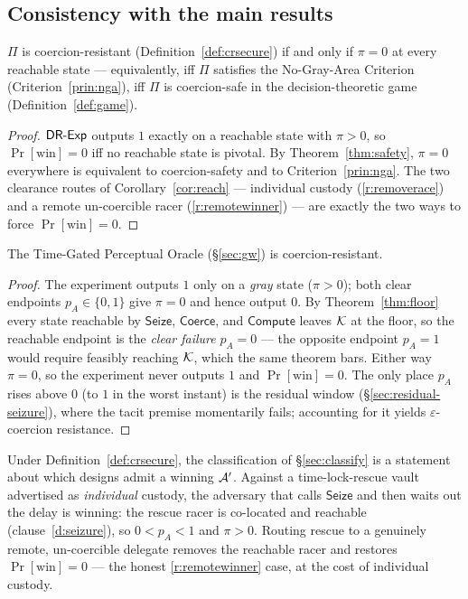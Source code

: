\subsection{Consistency with the main results}

\begin{theorem}\label{thm:game-nga}
$\Pi$ is coercion-resistant (Definition~\ref{def:crsecure}) if and only if
$\pi = 0$ at every reachable state --- equivalently, iff $\Pi$ satisfies the
No-Gray-Area Criterion (Criterion~\ref{prin:nga}), iff $\Pi$ is coercion-safe in
the decision-theoretic game (Definition~\ref{def:game}).
\end{theorem}
\begin{proof}
$\mathsf{DR}\text{-}\mathsf{Exp}$ outputs $1$ exactly on a reachable state with $\pi > 0$, so
$\Pr[\text{win}] = 0$ iff no reachable state is pivotal. By
Theorem~\ref{thm:safety}, $\pi = 0$ everywhere is equivalent to coercion-safety
and to Criterion~\ref{prin:nga}. The two clearance routes of
Corollary~\ref{cor:reach} --- individual custody (\ref{r:removerace}) and a remote
un-coercible racer (\ref{r:remotewinner}) --- are exactly the two ways to force
$\Pr[\text{win}] = 0$.
\end{proof}

\begin{corollary}\label{cor:tgpo-crsecure}
The Time-Gated Perceptual Oracle (\S\ref{sec:gw}) is coercion-resistant.
\end{corollary}
\begin{proof}
The experiment outputs $1$ only on a \emph{gray} state ($\pi > 0$); both clear
endpoints $p_A \in \{0,1\}$ give $\pi = 0$ and hence output $0$. By
Theorem~\ref{thm:floor} every state reachable by $\mathsf{Seize}$,
$\mathsf{Coerce}$, and $\mathsf{Compute}$ leaves $\mathcal{K}$ at the floor, so
the reachable endpoint is the \emph{clear failure} $p_A = 0$ --- the opposite
endpoint $p_A = 1$ would require feasibly reaching $\mathcal{K}$, which the same theorem
bars. Either way $\pi = 0$, so the experiment never outputs $1$ and
$\Pr[\text{win}] = 0$. The only place $p_A$ rises above $0$ (to $1$ in the worst
instant) is the residual window (\S\ref{sec:residual-seizure}), where the tacit premise
momentarily fails; accounting for it yields $\varepsilon$-coercion resistance.
\end{proof}

\begin{remark}
Under Definition~\ref{def:crsecure}, the classification of \S\ref{sec:classify} is
a statement about which designs admit a winning $\mathcal{A}'$. Against a
time-lock-rescue vault advertised as \emph{individual} custody, the adversary that
calls $\mathsf{Seize}$ and then waits out the delay is winning: the rescue racer is
co-located and reachable (clause~\ref{d:seizure}), so $0 < p_A < 1$ and $\pi > 0$.
Routing rescue to a genuinely remote, un-coercible delegate removes the reachable
racer and restores $\Pr[\text{win}] = 0$ --- the honest \ref{r:remotewinner} case,
at the cost of individual custody.
\end{remark}
